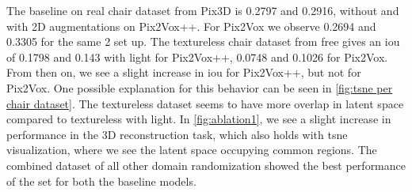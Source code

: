 The baseline on real chair dataset from Pix3D is 0.2797 and 0.2916, without and with 2D augmentations on Pix2Vox++.
For Pix2Vox we observe 0.2694 and 0.3305 for the same 2 set up.
The textureless chair dataset from \gls{free} gives an \gls{iou} of 0.1798 and 0.143 with light for Pix2Vox++, 0.0748 and 0.1026 for Pix2Vox.
From then on, we see a slight increase in \gls{iou} for Pix2Vox++, but not for Pix2Vox.
One possible explanation for this behavior can be seen in \autoref{fig:tsne per chair dataset}.
The textureless dataset seems to have more overlap in latent space compared to textureless with light.
In \autoref{fig:ablation1}, we see a slight increase in performance in the 3D reconstruction task, which also holds with \gls{tsne} visualization,
where we see the latent space occupying common regions.
The combined dataset of all other domain randomization showed the best performance of the set for both the baseline models.

